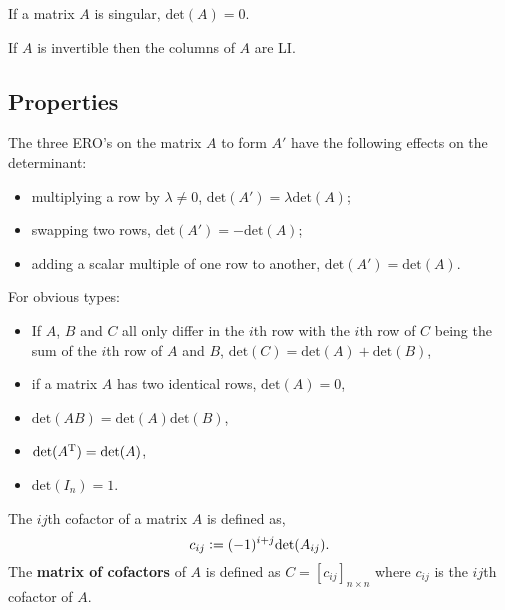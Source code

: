 \documentclass[../Year1/Year1.tex]{subfiles}
\begin{document}
\begin{theorem}
    If a matrix $A$ is singular, $\text{det}(A)=0$.
\end{theorem}

\begin{theorem}
    If $A$ is invertible then the columns of $A$ are LI.
\end{theorem}

\subsection{Properties}

\begin{definition}[EROs]
    The three ERO's on the matrix $A$ to form $A'$ have the following effects on the determinant: \begin{itemize}
        \item multiplying a row by $\lambda\neq0$, $\text{det}(A') = \lambda\text{det}(A)$;
        \item swapping two rows, $\text{det}(A') = -\text{det}(A)$;
        \item adding a scalar multiple of one row to another, $\text{det}(A') = \text{det}(A)$.
    \end{itemize}
\end{definition}

\begin{definition} For obvious types:
\begin{itemize}
    \item If $A$, $B$ and $C$ all only differ in the $i$th row with the $i$th row of $C$ being the sum of the $i$th row of $A$ and $B$, $\text{det}(C) = \text{det}(A) + \text{det}(B)$,
    \item if a matrix $A$ has two identical rows, $\text{det}(A)=0$,
    \item $\text{det}(AB)=\text{det}(A)\text{det}(B)$,
    \item $\text{det}(A^{\mathrm{T}}) = \text{det}(A)$,
    \item $\text{det}(I_n)=1$.
\end{itemize}
\end{definition}

\begin{definition}[Cofactor]
    The $ij$th cofactor of a matrix $A$ is defined as, \[
        c_{ij} := (-1)^{i+j}\text{det}(A_{ij})
        \textcolor{black}{.}
    \]
    The \textbf{matrix of cofactors} of $A$ is defined as $C=[c_{ij}]_{n\times n}$ where $c_{ij}$ is the $ij$th cofactor of $A$.
\end{definition}
\end{document}
